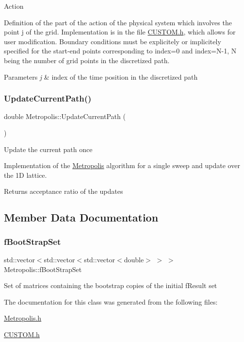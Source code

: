 Action

Definition of the part of the action of the physical system which involves the point j of the grid. Implementation is in the file \hyperlink{CUSTOM_8h}{C\+U\+S\+T\+O\+M.\+h}, which allows for user modification. Boundary conditions must be explicitely or implicitely specified for the start-\/end points corresponding to index=0 and index=N-\/1, N being the number of grid points in the discretized path. 
\begin{DoxyParams}{Parameters}
{\em j} & index of the time position in the discretized path \\
\hline
\end{DoxyParams}
\mbox{\label{classMetropolis_a79beaf1cf27f27cd43b7d1d03289d301}} 
\subsubsection{\texorpdfstring{Update\+Current\+Path()}{UpdateCurrentPath()}}
{\footnotesize\ttfamily double Metropolis\+::\+Update\+Current\+Path (\begin{DoxyParamCaption}{ }\end{DoxyParamCaption})}

Update the current path once

Implementation of the \hyperlink{classMetropolis}{Metropolis} algorithm for a single sweep and update over the 1D lattice. \begin{DoxyReturn}{Returns}
acceptance ratio of the updates 
\end{DoxyReturn}


\subsection{Member Data Documentation}
\mbox{\label{classMetropolis_ae7950341ed835f9ec689b46b2a913bed}} 
\subsubsection{\texorpdfstring{f\+Boot\+Strap\+Set}{fBootStrapSet}}
{\footnotesize\ttfamily std\+::vector$<$std\+::vector$<$std\+::vector$<$double$>$ $>$ $>$ Metropolis\+::f\+Boot\+Strap\+Set\hspace{0.3cm}{\ttfamily [private]}}

Set of matrices containing the bootstrap copies of the initial f\+Result set 

The documentation for this class was generated from the following files\+:\begin{DoxyCompactItemize}
\item 
\hyperlink{Metropolis_8h}{Metropolis.\+h}\item 
\hyperlink{CUSTOM_8h}{C\+U\+S\+T\+O\+M.\+h}\end{DoxyCompactItemize}

